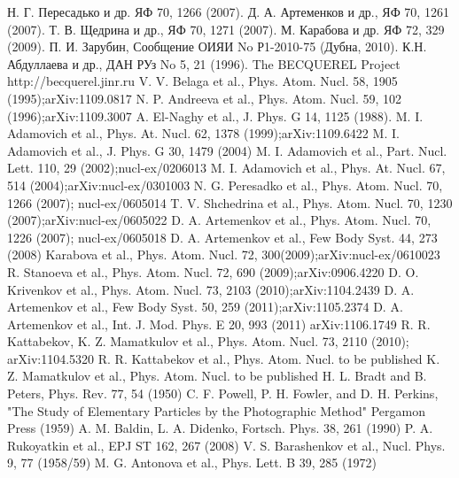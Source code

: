 \documentclass[fontsize=14pt]{scrarticle}
\begin{document}
	\newpage
\begin{thebibliography}{57}
 {Н. Г. Пересадько и др. ЯФ 70, 1266 (2007).}
 {Д. А. Артеменков и др., ЯФ 70, 1261 (2007).}
 {Т. В. Щедрина и др., ЯФ 70, 1271 (2007).}
 {М. Карабова и др. ЯФ 72, 329 (2009).}
 {П. И. Зарубин, Сообщение ОИЯИ No Р1-2010-75 (Дубна, 2010).}
 {К.Н. Абдуллаева и др., ДАН РУз No 5, 21 (1996).}
 {The BECQUEREL Project http://becquerel.jinr.ru}
 {V. V. Belaga et al., Phys. Atom. Nucl. 58, 1905 (1995);arXiv:1109.0817}
 {N. P. Andreeva et al., Phys. Atom. Nucl. 59, 102 (1996);arXiv:1109.3007}
 {A. El-Naghy et al., J. Phys. G 14, 1125 (1988).}
 {M. I. Adamovich et al., Phys. At. Nucl. 62, 1378 (1999);arXiv:1109.6422}
 {M. I. Adamovich et al., J. Phys. G 30, 1479 (2004)}
 {M. I. Adamovich et al., Part. Nucl. Lett. 110, 29 (2002);nucl-ex/0206013}
 {M. I. Adamovich et al., Phys. At. Nucl. 67, 514 (2004);arXiv:nucl-ex/0301003}
 {N. G. Peresadko et al., Phys. Atom. Nucl. 70, 1266 (2007); nucl-ex/0605014}
 {T. V. Shchedrina et al., Phys. Atom. Nucl. 70, 1230 (2007);arXiv:nucl-ex/0605022}
 {D. A. Artemenkov et al., Phys. Atom. Nucl. 70, 1226 (2007); nucl-ex/0605018}
 {D. A. Artemenkov et al., Few Body Syst. 44, 273 (2008)}
 {Karabova et al., Phys. Atom. Nucl. 72, 300(2009);arXiv:nucl-ex/0610023}
 {R. Stanoeva et al., Phys. Atom. Nucl. 72, 690 (2009);arXiv:0906.4220}
 {D. O. Krivenkov et al., Phys. Atom. Nucl. 73, 2103 (2010);arXiv:1104.2439}
 {D. A. Artemenkov et al., Few Body Syst. 50, 259 (2011);arXiv:1105.2374}
 {D. A. Artemenkov et al., Int. J. Mod. Phys. E 20, 993 (2011) arXiv:1106.1749}
 {R. R. Kattabekov, K. Z. Mamatkulov et al., Phys. Atom. Nucl. 73, 2110 (2010); arXiv:1104.5320}
 {R. R. Kattabekov et al., Phys. Atom. Nucl. to be published}
 {K. Z. Mamatkulov et al., Phys. Atom. Nucl. to be published}
 {H. L. Bradt and B. Peters, Phys. Rev. 77, 54 (1950)}
 {C. F. Powell, P. H. Fowler, and D. H. Perkins, "The Study of Elementary Particles by the Photographic Method" Pergamon Press (1959)}
 {A. M. Baldin, L. A. Didenko, Fortsch. Phys. 38, 261 (1990)}
 {P. A. Rukoyatkin et al., EPJ ST 162, 267 (2008)}
 {V. S. Barashenkov et al., Nucl. Phys. 9, 77 (1958/59)}
 {M. G. Antonova et al., Phys. Lett. B 39, 285 (1972)}

\end{thebibliography}
\end{document}
